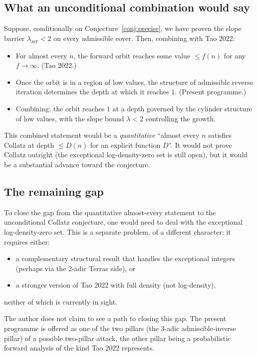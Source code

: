 \documentclass[11pt,a4paper]{article}
\theoremstyle{plain}
\theoremstyle{definition}
\begin{document}
\subsection{What an unconditional combination would say}

Suppose, conditionally on
Conjecture~\ref{conj:precise}, we have proven the slope barrier
$\lambda_{\mathrm{asy}} < 2$ on every admissible cover. Then,
combining with Tao 2022:
\begin{itemize}
   \item For almost every $n$, the forward orbit reaches some
         value $\le f(n)$ for any $f \to \infty$. (Tao 2022.)
   \item Once the orbit is in a region of low values, the
         structure of admissible reverse iteration determines
         the depth at which it reaches $1$. (Present programme.)
   \item Combining: the orbit reaches $1$ at a depth governed by
         the cylinder structure of low values, with the slope
         bound $\lambda < 2$ controlling the growth.
\end{itemize}
This combined statement would be a \emph{quantitative}
``almost every $n$ satisfies Collatz at depth $\le D(n)$ for an
explicit function $D$''. It would not prove Collatz outright
(the exceptional log-density-zero set is still open), but it
would be a substantial advance toward the conjecture.

\subsection{The remaining gap}

To close the gap from the quantitative almost-every statement to
the unconditional Collatz conjecture, one would need to deal with
the exceptional log-density-zero set. This is a separate problem,
of a different character: it requires either:
\begin{itemize}
   \item a complementary structural result that handles the
         exceptional integers (perhaps via the 2-adic Terras side),
         or
   \item a stronger version of Tao 2022 with full density (not
         log-density),
\end{itemize}
neither of which is currently in sight.

The author does not claim to see a path to closing this gap. The
present programme is offered as one of the two pillars (the
3-adic admissible-inverse pillar) of a possible two-pillar
attack, the other pillar being a probabilistic forward analysis
of the kind Tao 2022 represents.
\end{document}
